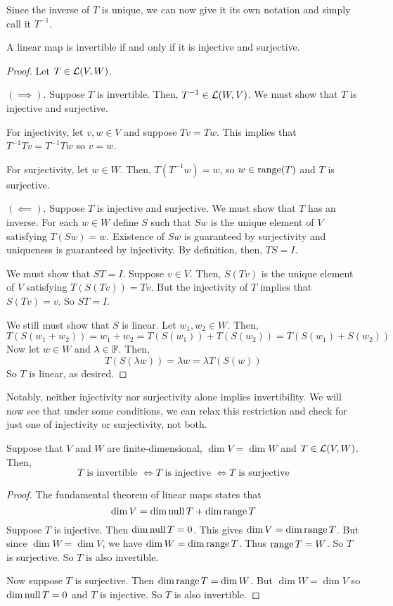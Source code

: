Since the inverse of $T$ is unique, we can now give it its own notation and simply call it $T^{-1}$.
\begin{theorem}
    A linear map is invertible if and only if it is injective and surjective.
\end{theorem}
\begin{proof}
    Let $T\in\mathcal{L}(V,W)$.

    $(\implies)$. Suppose $T$ is invertible. Then, $T^{-1}\in\mathcal{L}(W,V)$. We must show that $T$ is injective and surjective.

    For injectivity, let $v,w\in V$ and suppose $Tv = Tw$. This implies that $T^{-1}Tv = T^{-1}Tw$ so $v=w$.

    For surjectivity, let $w\in W$. Then, $T(T^{-1}w) = w$, so $w\in\operatorname{range}(T)$ and $T$ is surjective.

    $(\impliedby)$. Suppose $T$ is injective and surjective. We must show that $T$ has an inverse. For each $w\in W$ define $S$ such that $Sw$ is the unique element of $V$ satisfying $T(Sw) = w$. Existence of $Sw$ is guaranteed by surjectivity and uniqueness is guaranteed by injectivity. By definition, then, $TS = I$. 

    We must show that $ST = I$. Suppose $v\in V$. Then, $S(Tv)$ is the unique element of $V$ satisfying $T(S(Tv)) = Tv$. But the injectivity of $T$ implies that $S(Tv) = v$. So $ST = I$.  

    We still must show that $S$ is linear. Let $w_1, w_2\in W$. Then,
    \[ T(S(w_1 + w_2)) = w_1 + w_2 = T(S(w_1)) + T(S(w_2)) = T(S(w_1) + S(w_2)) \]
    Now let $w\in W$ and $\lambda\in\mathbb F$. Then,
    \[ T(S(\lambda w)) = \lambda w= \lambda T(S(w)) \]
    So $T$ is linear, as desired.
\end{proof}
Notably, neither injectivity nor surjectivity alone implies invertibility. We will now see that under some conditions, we can relax this restriction and check for just one of injectivity or surjectivity, not both.
\begin{theorem}
    Suppose that $V$ and $W$ are finite-dimensional, $\dim V = \dim W$ and $T\in\mathcal{L}(V,W)$. Then,
    \[ T\text{ is invertible }\iff T\text{ is injective } \iff T\text{ is surjective}\] 
\end{theorem}
\begin{proof}
    The fundamental theorem of linear maps states that
    \[ \dim V = \dim \operatorname{null} T + \dim \operatorname{range} T\]
    Suppose $T$ is injective. Then $\dim\operatorname{null} T = 0$. This gives $\dim V =\dim\operatorname{range} T$. But since $\dim W = \dim V$, we have $\dim W = \dim \operatorname{range} T$. Thus $\operatorname{range} T = W$. So $T$ is surjective. So $T$ is also invertible.

    Now suppose $T$ is surjective. Then $\dim\operatorname{range} T = \dim W$. But $\dim W = \dim V$ so $\dim \operatorname{null} T = 0$ and $T$ is injective. So $T$ is also invertible.
\end{proof}
